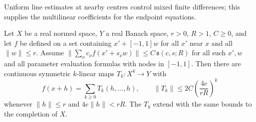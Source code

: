 Uniform line estimates at nearby centres control mixed finite differences; this supplies the multilinear coefficients for the endpoint equations.
\begin{lemma}\label{lem:D-stencil-recovery}
Let $X$ be a real normed space, $Y$ a real Banach space, $r>0$, $R>1$, $C\ge0$, and let $f$ be defined on a set containing $x'+[-1,1]w$ for all $x'$ near $x$ and all $\|w\|\le r$. Assume $\|\sum_\nu c_\nu f(x'+s_\nu w)\|\le C\,\mathfrak s(c,s;R)$ for all such $x',w$ and all parameter evaluation formulas with nodes in $[-1,1]$. Then there are continuous symmetric $k$-linear maps $T_k:X^k\to Y$ with
\begin{equation*}
f(x+h)=\sum_{k\ge0}T_k(h,\ldots,h),\qquad
\|T_k\|\le2C\left(\frac{4e}{rR}\right)^k
\end{equation*}
whenever $\|h\|\le r$ and $4e\|h\|<rR$. The $T_k$ extend with the same bounds to the completion of $X$.
\end{lemma}
